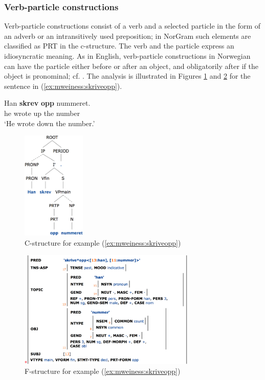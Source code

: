 \documentclass[output=paper]{langsci/langscibook}
\begin{document}
\subsubsection{Verb-particle constructions}\label{sec:mweiness:prtverbs}

Verb-particle constructions consist of a verb and a selected particle in the form of an adverb or an intransitively used preposition; in NorGram such elements are classified as PRT in the c-structure.
The verb and the particle express an idiosyncratic meaning.
As in English, verb-particle constructions in Norwegian can have the particle either before or after an object, and obligatorily after if the object is pronominal; cf. \cite[276]{Baldwin10}.
The analysis is illustrated in Figures \ref{fig:mweiness:particlecons-c} and \ref{fig:mweiness:particlecons-f} for the sentence in (\ref{ex:mweiness:skriveopp}).

\ea\label{ex:mweiness:skriveopp}
\gll Han \textbf{skrev} \textbf{opp} nummeret. \\
     he wrote up {the number}\\
\glt `He wrote down the number.'
\z


\begin{figure}
  \includegraphics[width=0.27\textwidth]{figures/particlecons-c.png}
  \caption{C-structure for example (\ref{ex:mweiness:skriveopp})}
  \label{fig:mweiness:particlecons-c}
\end{figure}

\begin{figure}
  \includegraphics[width=0.75\textwidth]{figures/particlecons-f.png}
  \caption{F-structure for example (\ref{ex:mweiness:skriveopp})}
  \label{fig:mweiness:particlecons-f}
\end{figure}
\end{document}
